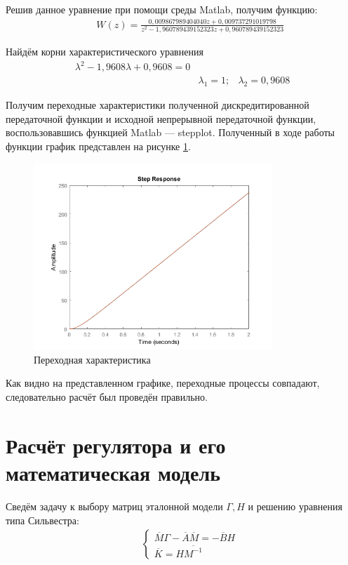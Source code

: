 \documentclass[fleqn, a4paper, 11pt, russian]{article}
\begin{document}
	Решив данное уравнение при помощи среды Matlab, получим функцию:
	\begin{align}
		&&W(z) = \displaystyle{\frac{0,009867989404040z + 0,009737291019798}{z^2 - 1,960789439152323z + 0,960789439152323}}
	\end{align}
	
	Найдём корни характеристического уравнения
	\begin{align}
		\lambda^2 - 1,9608\lambda + 0,9608 = 0\\
		&\lambda_1 = 1;  &\lambda_2 = 0,9608
	\end{align}
	
	Получим переходные характеристики полученной дискредитированной передаточной функции и исходной непрерывной передаточной функции, воспользовавшись функцией Matlab --- stepplot. Полученный в ходе работы функции график представлен на рисунке \ref{hWz}.
	\begin{figure}[ht!]
		\centering
		\includegraphics[width = 0.8\textwidth]{stepresp}
		\caption{Переходная характеристика}
		\label{hWz}	
	\end{figure}
	
	Как видно на представленном графике, переходные процессы совпадают, следовательно расчёт был проведён правильно.
	\clearpage
	\section{Расчёт регулятора и его математическая модель}
	Сведём задачу к выбору матриц эталонной модели $\Gamma, H$ и решению уравнения типа Сильвестра:
	\begin{align} \label{sylv}
		&&\begin{cases}
			\overline{M}\Gamma - \overline{A}\overline{M} = -\overline{B}H\\
			\overline{K} = H\overline{M^{-1}}
		\end{cases}
	\end{align}
\end{document}
